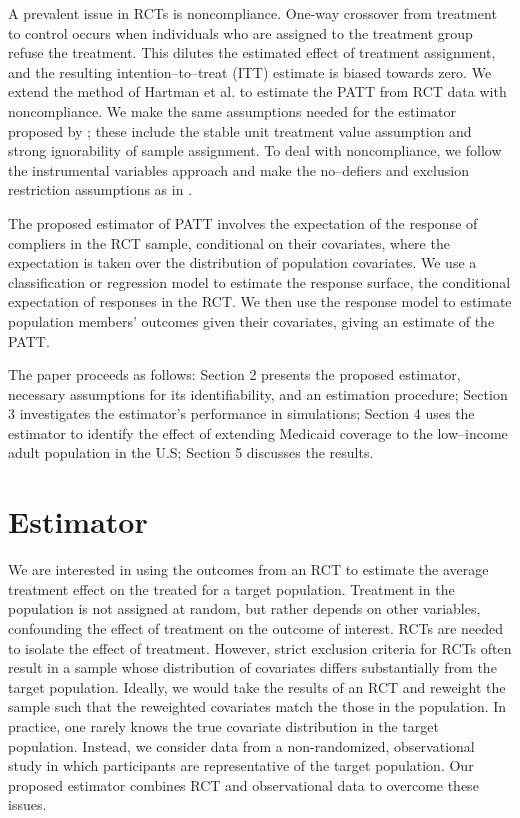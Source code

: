 \documentclass[12pt]{article}
\begin{document}
A prevalent issue in RCTs is noncompliance.  One-way crossover from treatment to control occurs when individuals who are assigned to the treatment group refuse the treatment.  This dilutes the estimated effect of treatment assignment, and the resulting intention--to--treat (ITT) estimate is biased towards zero.  We extend the method of Hartman et al. to estimate the PATT from RCT data with noncompliance.  We make the same assumptions needed for the estimator proposed by \cite{Hartman}; these include the stable unit treatment value assumption and strong ignorability of sample assignment.  To deal with noncompliance, we follow the instrumental variables approach and make the no--defiers and exclusion restriction assumptions as in \cite{Angrist1996}. 

The proposed estimator of PATT involves the expectation of the response of compliers in the RCT sample, conditional on their covariates, where the expectation is taken over the distribution of population covariates.  We use a classification or regression model to estimate the response surface, the conditional expectation of responses in the RCT.  We then use the response model to estimate population members' outcomes given their covariates, giving an estimate of the PATT. 

The paper proceeds as follows: Section 2 presents the proposed estimator, necessary assumptions for its identifiability, and an estimation procedure; Section 3 investigates the estimator's performance in simulations; Section 4 uses the estimator to identify the effect of extending Medicaid coverage to the low--income adult population in the U.S; Section 5 discusses the results. 

\section{Estimator} \label{estimator}
We are interested in using the outcomes from an RCT to estimate the average treatment effect on the treated for a target population.  Treatment in the population is not assigned at random, but rather depends on other variables, confounding the effect of treatment on the outcome of interest. RCTs are needed to isolate the effect of treatment. However, strict exclusion criteria for RCTs often result in a sample whose distribution of covariates differs substantially from the target population.  Ideally, we would take the results of an RCT and reweight the sample such that the reweighted covariates match the those in the population. In practice, one rarely knows the true covariate distribution in the target population.  Instead, we consider data from a non-randomized, observational study in which participants are representative of the target population.  Our proposed estimator combines RCT and observational data to overcome these issues.
\end{document}
